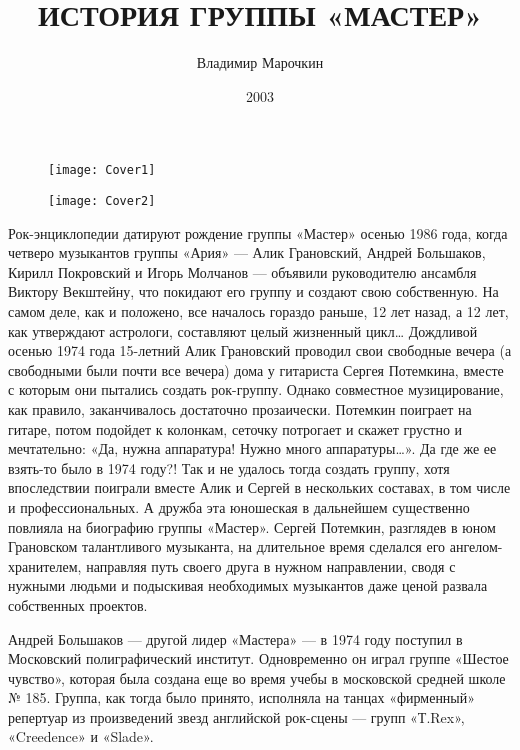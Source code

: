 \documentclass[16pt,a5paper,oneside]{book}
\begin{document}
\title{ИСТОРИЯ ГРУППЫ «МАСТЕР»}
\author{Владимир Марочкин}
\date{2003}

\begin{figure}
    \centering
    \texttt{[image: Cover1]}
\end{figure}

\begin{figure}
    \centering
    \texttt{[image: Cover2]}
\end{figure}

\maketitle

Рок-энциклопедии датируют рождение группы «Мастер» осенью 1986 года, когда четверо музыкантов группы «Ария» — Алик
Грановский, Андрей Большаков, Кирилл Покровский и Игорь Молчанов — объявили руководителю ансамбля Виктору Векштейну,
что покидают его группу и создают свою собственную. На самом деле, как и положено, все началось гораздо раньше, 12 лет
назад, а 12 лет, как утверждают астрологи, составляют целый жизненный цикл\ldots
\newline
\newline
Дождливой осенью 1974 года 15-летний Алик Грановский проводил свои свободные вечера (а свободными были почти все вечера)
дома у гитариста Сергея Потемкина, вместе с которым они пытались создать рок-группу. Однако совместное музицирование,
как правило, заканчивалось достаточно прозаически. Потемкин поиграет на гитаре, потом подойдет к колонкам, сеточку
потрогает и скажет грустно и мечтательно: «Да, нужна аппаратура! Нужно много аппаратуры\ldots». Да где же ее взять-то
было в 1974 году?! Так и не удалось тогда создать группу, хотя впоследствии поиграли вместе Алик и Сергей в нескольких
составах, в том числе и профессиональных. А дружба эта юношеская в дальнейшем существенно повлияла на биографию группы
«Мастер». Сергей Потемкин, разглядев в юном Грановском талантливого музыканта, на длительное время сделался его
ангелом-хранителем, направляя путь своего друга в нужном направлении, сводя с нужными людьми и подыскивая необходимых
музыкантов даже ценой развала собственных проектов.

Андрей Большаков — другой лидер «Мастера» — в 1974 году поступил в Московский полиграфический институт. Одновременно он
играл группе «Шестое чувство», которая была создана еще во время учебы в московской средней школе № 185. Группа, как
тогда было принято, исполняла на танцах «фирменный» репертуар из произведений звезд английской рок-сцены — групп
«Т.Rex», «Creedence» и «Slade».
\end{document}
